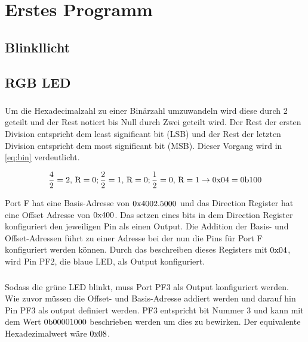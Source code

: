 \section{Erstes Programm}
\subsection{Blinkllicht}
\subsection{RGB LED}
\subsubsection{}
Um die Hexadecimalzahl zu einer Binärzahl umzuwandeln wird diese durch 2 geteilt und der Rest notiert bis Null durch Zwei geteilt wird. Der Rest der ersten Division entspricht dem least significant bit (LSB) und der Rest der letzten Division entspricht dem most significant bit (MSB). Dieser Vorgang wird in \autoref{eq:bin} verdeutlicht.
 
\begin{equation}
\label{eq:bin}
\frac{4}{2}=2,\, \text{R}=0;\\
\frac{2}{2}=1,\, \text{R}=0;\\
\frac{1}{2}=0,\, \text{R}=1 \\\rightarrow
0\text x 04=0\text b100
\end{equation}

Port F hat eine Basis-Adresse von $0\text x 4002.5000$ und das Direction Register hat eine Offset Adresse von $0\text x 400$.  Das setzen eines bits in dem Direction Register konfiguriert den jeweiligen Pin als einen Output. Die Addition der Basis- und Offset-Adressen führt zu einer Adresse bei der nun die Pins für Port F konfiguriert werden können. Durch das beschreiben dieses Registers mit $0\text x 04 $, wird Pin PF2, die blaue LED, als Output konfiguriert.

\subsubsection{}
Sodass die grüne LED blinkt, muss Port PF3 als Output konfiguriert werden. Wie zuvor müssen die Offset- und Basis-Adresse addiert werden und darauf hin Pin PF3 als output definiert werden. PF3 entspricht bit Nummer 3 und kann mit dem Wert $0\text b 00001000$ beschrieben werden um dies zu bewirken. Der equivalente Hexadezimalwert wäre $0\text x 08$.

